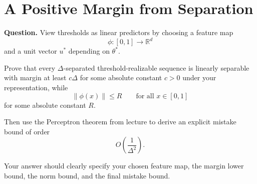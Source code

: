 \documentclass{article}
\begin{document}
\section{A Positive Margin from Separation}

\textbf{Question.}
\newline
View thresholds as linear predictors by choosing a feature map
\[
\phi:[0,1]\to \mathbb{R}^d
\]
and a unit vector $u^*$ depending on $\theta^*$.

Prove that every $\Delta$-separated threshold-realizable sequence is linearly
separable with margin at least $c\Delta$ for some absolute constant $c>0$
under your representation, while
\[
\|\phi(x)\|\le R
\qquad \text{for all } x\in [0,1]
\]
for some absolute constant $R$.

Then use the Perceptron theorem from lecture to derive an explicit mistake
bound of order
\[
O\!\left(\frac{1}{\Delta^2}\right).
\]

Your answer should clearly specify your chosen feature map, the margin lower
bound, the norm bound, and the final mistake bound.
\end{document}
